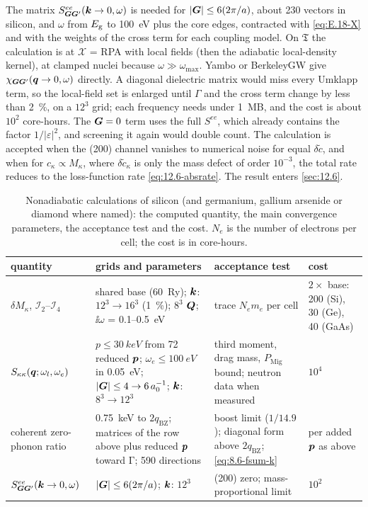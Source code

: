 The matrix $S^{ee}_{\bm{G}\bm{G}'}(\bm{k}\to0,\omega)$ is needed for $|\bm{G}| \le 6(2\pi/a)$, about 230 vectors in silicon, and $\omega$ from $E_{\mathrm{g}}$ to \SI{100}{eV} plus the core edges, contracted with \cref{eq:E.18-X} and with the weights of the cross term for each coupling model. On $\mathfrak{T}$ the calculation is at $\mathcal{X}$ = RPA with local fields (then the adiabatic local-density kernel), at clamped nuclei because $\omega \gg \omega_{\mathrm{max}}$. Yambo or BerkeleyGW give $\chi_{\bm{G}\bm{G}'}(\bm{q}\to0,\omega)$ directly. A diagonal dielectric matrix would miss every Umklapp term, so the local-field set is enlarged until $\varGamma$ and the cross term change by less than \SI{2}{\percent}, on a $12^3$ grid; each frequency needs under \SI{1}{MB}, and the cost is about $10^2$ core-hours. The $\bm{G} = 0$ term uses the full $S^{ee}$, which already contains the factor $1/|\varepsilon|^2$, and screening it again would double count. The calculation is accepted when the (200) channel vanishes to numerical noise for equal $\delta\tilde c$, and when for $c_\kappa \propto M_\kappa$, where $\delta\tilde c_\kappa$ is only the mass defect of order $10^{-3}$, the total rate reduces to the loss-function rate \cref{eq:12.6-absrate}. The result enters \cref{sec:12.6}.

\begin{table}[t]
  \centering
  \caption{Nonadiabatic calculations of silicon (and germanium, gallium arsenide or diamond where named): the computed quantity, the main convergence parameters, the acceptance test and the cost. $N_e$ is the number of electrons per cell; the cost is in core-hours.}
  \label{tab:E18-params}
  \small
  \setlength{\tabcolsep}{4pt}
  \begin{tabular}{p{}p{}p{}p{}}
    \toprule
    quantity & grids and parameters & acceptance test & cost \\
    \midrule
    $\delta M_\kappa$, $\mathcal{I}_2$--$\mathcal{I}_4$ & shared base (\SI{60}{Ry}); $\bm{k}$: $12^3\to16^3$ (\SI{1}{\percent}); $8^3$ $\bm{Q}$; $\ii\omega$ = 0.1--\SI{0.5}{eV} & trace $N_e m_e$ per cell & $2\times$ base: 200 (Si), 30 (Ge), 40 (GaAs) \\
    $S_{\kappa\kappa}(\bm{q};\omega_l,\omega_e)$ & $p \le \SI{30}{keV}$ from 72 reduced $\bm{p}$; $\omega_e \le \SI{100}{eV}$ in \SI{0.05}{eV}; $|\bm{G}| \le 4\to6\,a_0^{-1}$; $\bm{k}$: $8^3\to12^3$ & third moment, drag mass, $P_{\mathrm{Mig}}$ bound; neutron data when measured & $10^4$ \\
    coherent zero-phonon ratio & \SI{0.75}{keV} to $2q_{\mathrm{BZ}}$; matrices of the row above plus reduced $\bm{p}$ toward $\mathrm{\Gamma}$; 590 directions & boost limit ($1/14.9$); diagonal form above $2q_{\mathrm{BZ}}$; \cref{eq:8.6-fsum-k} & per added $\bm{p}$ as above \\
    $S^{ee}_{\bm{G}\bm{G}'}(\bm{k}\to0,\omega)$ & $|\bm{G}| \le 6(2\pi/a)$; $\bm{k}$: $12^3$ & (200) zero; mass-proportional limit & $10^2$ \\
    \bottomrule
  \end{tabular}
\end{table}
